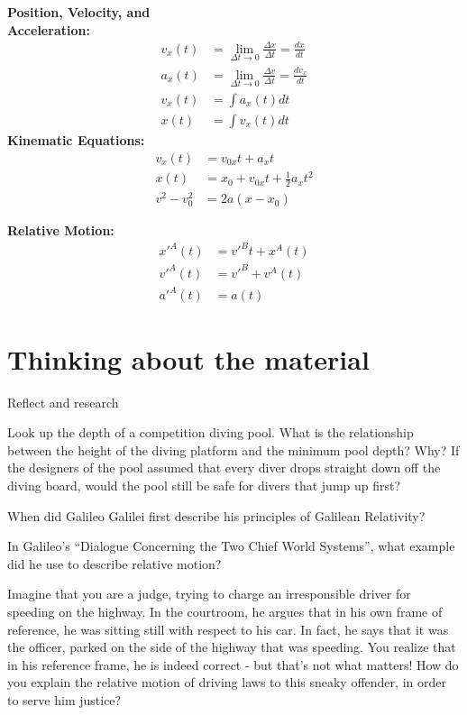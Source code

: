 \begin{importantEquations}
\begin{multicols}{2}
\begin{center}
\textbf{Position, Velocity, and\\ Acceleration:}
\begin{align*}
v_x(t)&=\lim_{\Delta t\to 0}\frac{\Delta x}{\Delta t}=\frac{dx}{dt}\\
a_x(t)&=\lim_{\Delta t\to 0}\frac{\Delta v}{\Delta t}=\frac{dv_x}{dt}\\
v_x(t)&=\int a_x(t)dt\\
x(t)&=\int v_x(t)dt
\end{align*}
\textbf{Kinematic Equations:}
\begin{align*}
v_x(t)&=v_{0x}t+a_xt\\
x(t)&=x_0+v_{0x}t+\frac{1}{2}a_xt^2\\
v^2-v_0^2&=2a(x-x_0)
\end{align*}
\end{center}
\columnbreak
\begin{center}
\textbf{Relative Motion:}\\
\begin{align*}
x'^A(t) &= v'^Bt + x^A(t)\\
v'^A(t) &=v'^B+v^A(t)\\
a'^A(t) &= a(t)
\end{align*}
\end{center}
\end{multicols}
\end{importantEquations}
\newpage
\section{Thinking about the material}
\vspace{0.25cm}
\begin{chapteractivity}{Reflect and research}
{
\item Look up the depth of a competition diving pool. What is the relationship between the height of the diving platform and the minimum pool depth? Why? If the designers of the pool assumed that every diver drops straight down off the diving board, would the pool still be safe for divers that jump up first?
\item When did Galileo Galilei first describe his principles of Galilean Relativity?
\item In Galileo's ``Dialogue Concerning the Two Chief World Systems'', what example did he use to describe relative motion?
\item Imagine that you are a judge, trying to charge an irresponsible driver for speeding on the highway. In the courtroom, he argues that in his own frame of reference, he was sitting still with respect to his car. In fact, he says that it was the officer, parked on the side of the highway that was speeding. You realize that in his reference frame, he is indeed correct - but that's not what matters! How do you explain the relative motion of driving laws to this sneaky offender, in order to serve him justice?
}
\end{chapteractivity}


